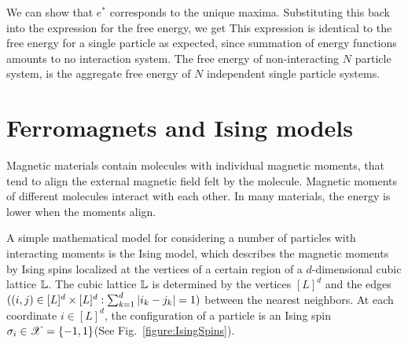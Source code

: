 \documentclass[letterpaper,english,10pt]{article}
\begin{document}
\begin{shaded*}
\begin{exmp}
We can show that $e^{\ast}$ corresponds to the unique maxima. %
Substituting this back into the expression for the free energy, we get 
This expression is identical to the free energy for a single particle as expected, 
since summation of energy functions amounts to no interaction system. 
The free energy of non-interacting $N$ particle system, is the aggregate free energy of $N$ independent single particle systems. 
\end{exmp}
\end{shaded*}

\section{Ferromagnets and Ising models}
Magnetic materials contain molecules with individual magnetic moments, that tend to align the external magnetic field felt by the molecule. 
Magnetic moments of different molecules interact with each other. 
In many materials, the energy is lower when the moments align. 

A simple mathematical model for considering a number of particles with interacting moments is the Ising model, which describes the magnetic moments by Ising spins localized at the vertices of a certain region of a $d$-dimensional cubic lattice $\mathbb{L}$. 
The cubic lattice $\mathbb{L}$ is determined by the vertices $[L]^d$ and the edges $((i,j) \in [L]^d \times [L]^d: \sum_{k=1}^d\left\lvert i_k-j_k\right\rvert = 1)$ between the nearest neighbors.  
At each coordinate $i \in [L]^d$, the configuration of a particle is an Ising spin $\sigma_i \in \mathscr{X} = \{-1,1\}$(See Fig.~\ref{figure:IsingSpins}). 
\end{document}

